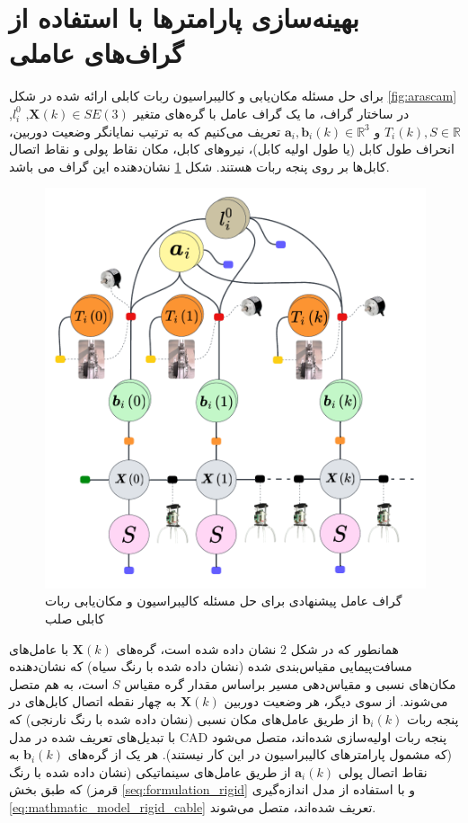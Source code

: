 \section{بهینه‌سازی پارامترها با استفاده از گراف‌های عاملی} \label{seq:factor_graph_for_rigid_cable}

برای حل مسئله مکان‌یابی و کالیبراسیون ربات کابلی ارائه شده در شکل
\ref{fig:arascam}
در ساختار گراف، ما یک گراف عامل با گره‌های متغیر 
$\boldsymbol{X}(k) \in SE(3)$,
$l_{i}^0$,
$T_i(k), S \in \mathbb{R}$ 
و
$\boldsymbol{a}_i, \boldsymbol{b}_i(k) \in \mathbb{R}^3$ 
تعریف می‌کنیم که به ترتیب نمایانگر وضعیت دوربین، انحراف طول کابل (یا طول اولیه کابل)، نیرو‌های کابل، مکان نقاط پولی و نقاط اتصال کابل‌ها بر روی پنجه ربات هستند. شکل 
\ref{fig:rigidcable_factorgraph}
نشان‌دهنده این گراف می باشد. 
\begin{figure}
	\centering
	\includegraphics[width=0.6\linewidth]{img/rigidcable_factorgraph}
	\caption{گراف عامل پیشنهادی برای حل مسئله کالیبراسیون و مکان‌یابی ربات کابلی صلب}
	\label{fig:rigidcable_factorgraph}
\end{figure}


همانطور که در شکل 2 نشان داده شده است، گره‌های
$\boldsymbol{X}(k)$
با عامل‌های مسافت‌پیمایی مقیاس‌بندی شده (نشان داده شده با رنگ سیاه) که نشان‌دهنده مکان‌های نسبی و مقیاس‌دهی مسیر براساس مقدار گره مقیاس 
$S$
 است، به هم متصل می‌شوند. از سوی دیگر، هر وضعیت دوربین 
$\boldsymbol{X}(k)$
 به چهار نقطه اتصال کابل‌های در پنجه ربات
$\boldsymbol{b}_i(k)$
از طریق عامل‌های مکان نسبی (نشان داده شده با رنگ نارنجی) که با تبدیل‌های تعریف شده در مدل CAD پنجه ربات اولیه‌سازی شده‌اند، متصل می‌شود (که مشمول پارامترهای کالیبراسیون در این کار نیستند). هر یک از گره‌های
$\boldsymbol{b}_i(k)$
به نقاط اتصال پولی
$\boldsymbol{a}_i(k)$
از طریق عامل‌های سینماتیکی (نشان داده شده با رنگ قرمز) که طبق بخش 
\ref{seq:formulation_rigid}
 و با استفاده از مدل اندازه‌گیری
\ref{eq:mathmatic_model_rigid_cable}
تعریف شده‌اند، متصل می‌شوند.

